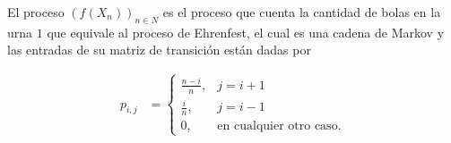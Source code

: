 El proceso $(f(X_n))_{n \in N}$ es el proceso que cuenta la cantidad de bolas en la urna $1$ que equivale al proceso
de Ehrenfest, el cual es una cadena de Markov y las entradas de su matriz de transición están dadas por

\begin{align}
        p_{i,j}     &=  
                        \begin{cases}
                            \frac{n-i}{n},  &   j=i+1   \\
                            \frac{i}{n},    &   j=i-1   \\
                            0,              &   \text{en cualquier otro caso.}
                        \end{cases}
\end{align}